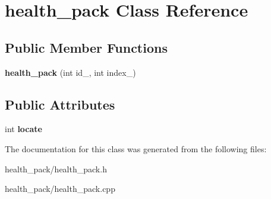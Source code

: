 \hypertarget{classhealth__pack}{\section{health\+\_\+pack Class Reference}
\label{classhealth__pack}
}
\subsection*{Public Member Functions}
\begin{DoxyCompactItemize}
\item 
\hypertarget{classhealth__pack_a2bb69c950e691f9a8c15c9fefb649e67}{{\bfseries health\+\_\+pack} (int id\+\_\+, int index\+\_\+)}\label{classhealth__pack_a2bb69c950e691f9a8c15c9fefb649e67}

\end{DoxyCompactItemize}
\subsection*{Public Attributes}
\begin{DoxyCompactItemize}
\item 
\hypertarget{classhealth__pack_a0f5c9f97ad478d29226b17eebe16254c}{int {\bfseries locate}}\label{classhealth__pack_a0f5c9f97ad478d29226b17eebe16254c}

\end{DoxyCompactItemize}


The documentation for this class was generated from the following files\+:\begin{DoxyCompactItemize}
\item 
health\+\_\+pack/health\+\_\+pack.\+h\item 
health\+\_\+pack/health\+\_\+pack.\+cpp\end{DoxyCompactItemize}
